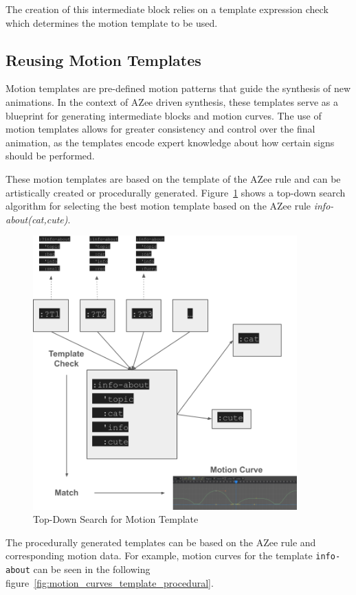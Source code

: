\documentclass[../../main.tex]{subfiles}
\begin{document}
The creation of this intermediate block relies on a template expression check which determines the motion template to be used. 

\subsection{Reusing Motion Templates}
\label{ch:intermediate_blocks:reusing_motion_templates}

Motion templates are pre-defined motion patterns that guide the synthesis of new animations. In the context of AZee driven synthesis, these templates serve as a blueprint for generating intermediate blocks and motion curves. The use of motion templates allows for greater consistency and control over the final animation, as the templates encode expert knowledge about how certain signs should be performed.

These motion templates are based on the template of the AZee rule and can be artistically created or procedurally generated. Figure~\ref{fig:top_down_search_template} shows a top-down search algorithm for selecting the best motion template based on the AZee rule \emph{info-about(cat,cute)}.

\begin{figure}
    \centering \includegraphics[width = 4in]{chapters/intermediate_blocks/images/top_down_search_template.png}
    \caption{Top-Down Search for Motion Template}
    \label{fig:top_down_search_template}
\end{figure}

The procedurally generated templates can be based on the AZee rule and corresponding motion data. For example, motion curves for the template \texttt{info-about} can be seen in the following figure~\ref{fig:motion_curves_template_procedural}.
\end{document}
